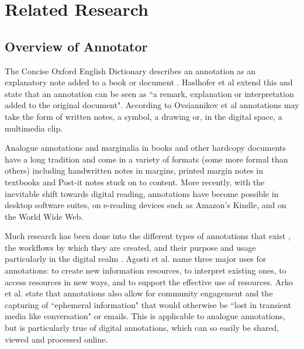
\chapter{Related Research} %

\label{Chapter3} %



\section{Overview of Annotator}
The Concise Oxford English Dictionary describes an annotation as an explanatory note added to a book or document \citep{OxfordDict}. Haslhofer et al \citep{LEMO} extend this and state that an annotation can be seen as ``a remark, explanation or interpretation added to the original document". According to Ovsiannikov et al \citep{Ovsiannikov} annotations may take the form of written notes, a symbol, a drawing or, in the digital space, a multimedia clip. 

Analogue annotations and marginalia in books and other hardcopy documents have a long tradition \citep{LEMO} and come in a variety of formats (some more formal than others) including handwritten notes in margins, printed margin notes in textbooks and Post-it notes stuck on to content. More recently, with the inevitable shift towards digital reading, annotations have become possible in desktop software suites, on e-reading devices such as Amazon's Kindle, and on the World Wide Web. 

Much research has been done into the different types of annotations that exist \citep{Marshall2000} \citep{Marshall2004}, the workflows by which they are created, and their purpose and usage  particularly in the digital realm \citep{Agosti} \citep{Ovsiannikov}. Agosti et al. \citep{Agosti} name three major uses for annotations: to create new information resources, to interpret existing ones, to access resources in new ways, and to support the effective use of resources.  Arko et al. \citep{Arko} state that annotations also allow for community engagement and the capturing of ``ephemeral information" that would otherwise be ``lost in transient media like conversation" or emails. This is applicable to analogue annotations, but is particularly true of digital annotations, which can so easily be shared, viewed and processed online.

